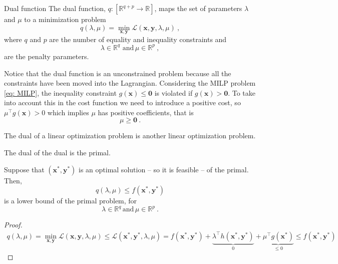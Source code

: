 \begin{definition}{Dual function}{}
The dual function, $q: \left[\mathbb{R}^{q+p}\rightarrow\mathbb{R}\right]$, maps the set of parameters $\lambda$ and $\mu$ to a minimization problem
\begin{equation}
    q(\lambda, \mu) = \min_{\mathbf{x}, \mathbf{y}}\mathcal{L}(\mathbf{x},\mathbf{y}, \lambda, \mu)\ ,
\end{equation}
where $q$ and $p$ are the number of equality and inequality constraints and
\begin{equation}
    \lambda\in\mathbb{R}^{q}\,\, \textrm{and}\, \mu\in\mathbb{R}^{p}\ ,
\end{equation}
are the penalty parameters.
\end{definition}
Notice that the dual function is an unconstrained problem because all the constraints have been moved into the Lagrangian.
Considering the MILP problem \eqref{eq: MILP}, the inequality constraint $g(\mathbf{x})\leq \mathbf{0}$ is violated if $g(\mathbf{x})>\mathbf{0}$. To take into account this in the cost function we need to introduce a positive cost, so $\mu^{\intercal}g(\mathbf{x})>0$ which implies $\mu$ has positive coefficients, that is
\begin{equation}
    \mu \geq \mathbf{0}\ .
\end{equation}
\begin{theorem}{}{}
The dual of a linear optimization problem is another linear optimization problem.
\end{theorem}
\begin{theorem}{}{}
The dual of the dual is the primal.
\end{theorem}
\begin{theorem}{}{}
Suppose that $(\mathbf{x}^{*}, \mathbf{y}^{*})$ is an optimal solution -- so it is feasible -- of the primal. Then,
\begin{equation}
    q(\lambda, \mu) \leq f(\mathbf{x}^{*},\mathbf{y}^{*})
\end{equation}
is a lower bound of the primal problem, for
\begin{equation}
    \lambda\in\mathbb{R}^{q}\, \textrm{and}\, \mu\in\mathbb{R}^{p}\ .
\end{equation}
\end{theorem}
\begin{proof}
\begin{align}
    q(\lambda, \mu) = \min_{\mathbf{x}, \mathbf{y}} \mathcal{L}(\mathbf{x}, \mathbf{y}, \lambda, \mu) \leq \mathcal{L}(\mathbf{x}^{*}, \mathbf{y}^{*}, \lambda, \mu) = f(\mathbf{x}^{*}, \mathbf{y}^{*}) + \underbrace{\lambda^{\intercal}h(\mathbf{x}^{*}, \mathbf{y}^{*})}_{0} + \underbrace{\mu^{\intercal}g(\mathbf{x}^{*})}_{\leq 0} \leq f(\mathbf{x}^{*}, \mathbf{y}^{*})
\end{align}
\end{proof}
